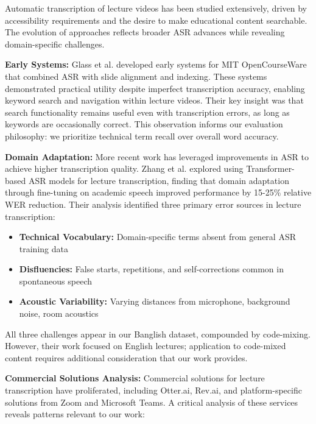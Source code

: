 Automatic transcription of lecture videos has been studied extensively, driven by accessibility requirements and the desire to make educational content searchable. The evolution of approaches reflects broader ASR advances while revealing domain-specific challenges.

\textbf{Early Systems:} Glass et al. \cite{Glass2007} developed early systems for MIT OpenCourseWare that combined ASR with slide alignment and indexing. These systems demonstrated practical utility despite imperfect transcription accuracy, enabling keyword search and navigation within lecture videos. Their key insight was that search functionality remains useful even with transcription errors, as long as keywords are occasionally correct. This observation informs our evaluation philosophy: we prioritize technical term recall over overall word accuracy.

\textbf{Domain Adaptation:} More recent work has leveraged improvements in ASR to achieve higher transcription quality. Zhang et al. \cite{Zhang2021} explored using Transformer-based ASR models for lecture transcription, finding that domain adaptation through fine-tuning on academic speech improved performance by 15-25\% relative WER reduction. Their analysis identified three primary error sources in lecture transcription:

\begin{itemize}
    \item \textbf{Technical Vocabulary:} Domain-specific terms absent from general ASR training data
    \item \textbf{Disfluencies:} False starts, repetitions, and self-corrections common in spontaneous speech
    \item \textbf{Acoustic Variability:} Varying distances from microphone, background noise, room acoustics
\end{itemize}

All three challenges appear in our Banglish dataset, compounded by code-mixing. However, their work focused on English lectures; application to code-mixed content requires additional consideration that our work provides.

\textbf{Commercial Solutions Analysis:} Commercial solutions for lecture transcription have proliferated, including Otter.ai, Rev.ai, and platform-specific solutions from Zoom and Microsoft Teams. A critical analysis of these services reveals patterns relevant to our work:


